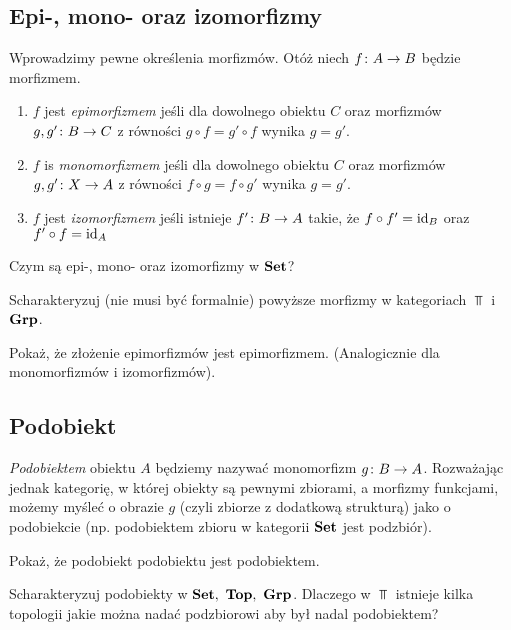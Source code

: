 \subsection{Epi-, mono- oraz izomorfizmy}
Wprowadzimy pewne określenia morfizmów. Otóż niech $f\colon A\to B$ będzie morfizmem.

\begin{enumerate}
  \item $f$ jest \emph{epimorfizmem} jeśli dla dowolnego obiektu $C$ oraz morfizmów $g, g'\colon B\to C$ z równości $g\circ f= g'\circ f$ wynika $g=g'$.
  \item $f$ is \emph{monomorfizmem} jeśli dla dowolnego obiektu $C$ oraz morfizmów $g, g'\colon X\to A$ z równości $f\circ g= f\circ g'$ wynika $g=g'$.
  \item $f$ jest \emph{izomorfizmem} jeśli istnieje $f'\colon B\to A$ takie, że $f\circ f'=\mathrm{id}_{B}$ oraz $f'\circ f=\mathrm{id}_{A}$
\end{enumerate}

\begin{problem}
  Czym są epi-, mono- oraz izomorfizmy w $\textbf{Set}$?
\end{problem}

\begin{problem}
  Scharakteryzuj (nie musi być formalnie) powyższe morfizmy w kategoriach $\Top$ i $\textbf{Grp}$.
\end{problem}

\begin{problem}
  Pokaż, że złożenie epimorfizmów jest epimorfizmem. (Analogicznie dla monomorfizmów i izomorfizmów).
\end{problem}

\subsection{Podobiekt}
\textit{Podobiektem} obiektu $A$ będziemy nazywać monomorfizm $g\colon B\to A$. Rozważając jednak kategorię, w której obiekty są pewnymi zbiorami, a morfizmy funkcjami, możemy
myśleć o obrazie $g$ (czyli zbiorze z dodatkową strukturą) jako o podobiekcie (np. podobiektem zbioru w kategorii $\textbf{Set}$ jest podzbiór).

\begin{problem}
  Pokaż, że podobiekt podobiektu jest podobiektem.
\end{problem}

\begin{problem}
  Scharakteryzuj podobiekty w $\textbf{Set},~\textbf{Top},~\textbf{Grp}$. Dlaczego w $\Top$ istnieje kilka topologii jakie można nadać podzbiorowi aby był nadal podobiektem?
\end{problem}

